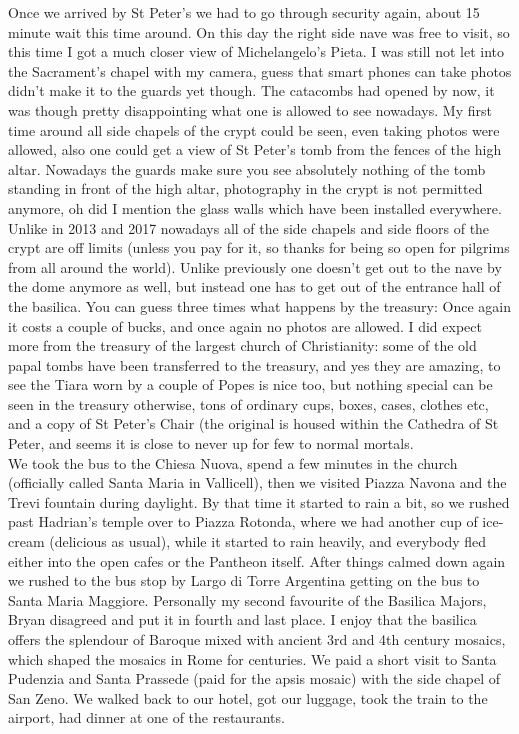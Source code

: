   Once we arrived by St Peter's we had to go through security again, about 15 minute wait this time around. On this day the right side nave was free to visit, so this time I got a much closer view of Michelangelo's Pieta. I was still not let into the Sacrament's chapel with my camera, guess that smart phones can take photos didn't make it to the guards yet though. The catacombs had opened by now, it was though pretty disappointing what one is allowed to see nowadays. My first time around all side chapels of the crypt could be seen, even taking photos were allowed, also one could get a view of St Peter's tomb from the fences of the high altar. Nowadays the guards make sure you see absolutely nothing of the tomb standing in front of the high altar, photography in the crypt is not permitted anymore, oh did I mention the glass walls which have been installed everywhere. Unlike in 2013 and 2017 nowadays all of the side chapels and side floors of the crypt are off limits (unless you pay for it, so thanks for being so open for pilgrims from all around the world). Unlike previously one doesn't get out to the nave by the dome anymore as well, but instead one has to get out of the entrance hall of the basilica. You can guess three times what happens by the treasury: Once again it costs a couple of bucks, and once again no photos are allowed. I did expect more from the treasury of the largest church of Christianity: some of the old papal tombs have been transferred to the treasury, and yes they are amazing, to see the Tiara worn by a couple of Popes is nice too, but nothing special can be seen in the treasury otherwise, tons of ordinary cups, boxes, cases, clothes etc, and a copy of St Peter's Chair (the original is housed within the Cathedra of St Peter, and seems it is close to never up for few to normal mortals. \\
We took the bus to the Chiesa Nuova, spend a few minutes in the church (officially called Santa Maria in Vallicell), then we visited Piazza Navona and the Trevi fountain during daylight. By that time it started to rain a bit, so we rushed past Hadrian's temple over to Piazza Rotonda, where we had another cup of ice-cream (delicious as usual), while it started to rain heavily, and everybody fled either into the open cafes or the Pantheon itself. After things calmed down again we rushed to the bus stop by Largo di Torre Argentina getting on the bus to Santa Maria Maggiore. Personally my second favourite of the Basilica Majors, Bryan disagreed and put it in fourth and last place. I enjoy that the basilica offers the splendour of Baroque mixed with ancient 3rd and 4th century mosaics, which shaped the mosaics in Rome for centuries. We paid a short visit to Santa Pudenzia and Santa Prassede (paid for the apsis mosaic) with the side chapel of San Zeno. We walked back to our hotel, got our luggage, took the train to the airport, had dinner at one of the restaurants.\\

